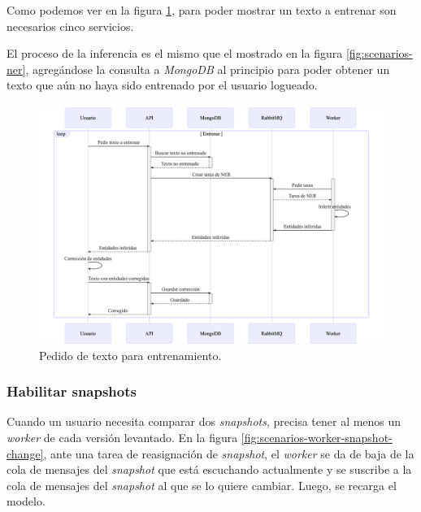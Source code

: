 \documentclass[12pt,a4paper,]{scrartcl}
\begin{document}
Como podemos ver en la figura \ref{fig:scenarios-web-train}, para poder mostrar un texto a entrenar son necesarios cinco servicios.

El proceso de la inferencia es el mismo que el mostrado en la figura \ref{fig:scenarios-ner}, agregándose la consulta a \emph{MongoDB} al principio para poder obtener un texto que aún no haya sido entrenado por el usuario logueado.

\begin{figure}[H]

{\centering \includegraphics{assets/mermaid/scenarios-web-train.png} 

}

\caption{Pedido de texto para entrenamiento.}\label{fig:scenarios-web-train}
\end{figure}

\hypertarget{habilitar-snapshots}{%
\subsubsection{Habilitar snapshots}\label{habilitar-snapshots}}

Cuando un usuario necesita comparar dos \emph{snapshots}, precisa tener al menos un \emph{worker} de cada versión levantado. En la figura \ref{fig:scenarios-worker-snapshot-change}, ante una tarea de reasignación de \emph{snapshot}, el \emph{worker} se da de baja de la cola de mensajes del \emph{snapshot} que está escuchando actualmente y se suscribe a la cola de mensajes del \emph{snapshot} al que se lo quiere cambiar. Luego, se recarga el modelo.
\end{document}
